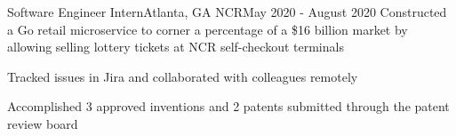 \resumeSubheading
{Software Engineer Intern}{Atlanta, GA}
{NCR}{May 2020 - August 2020}
\resumeItemListStart
\resumeItem
{
  Constructed a Go retail microservice to corner a percentage of a \$16 billion
  market by allowing selling lottery tickets at NCR self-checkout terminals
}

\resumeItem
{
  Tracked issues in Jira and collaborated with colleagues remotely
}

\resumeItem
{
  Accomplished 3 approved inventions and 2 patents submitted through the patent review board
}

\resumeItemListEnd
